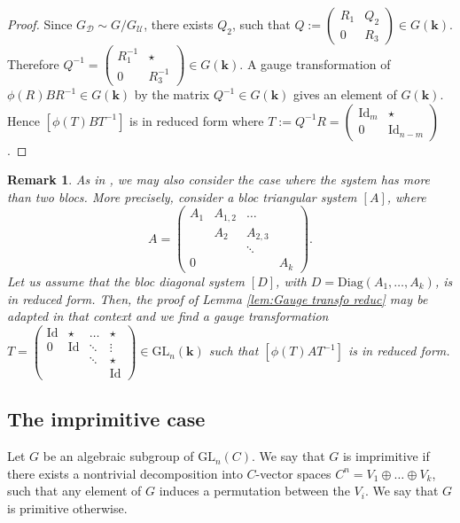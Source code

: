 \documentclass[a4paper,11pt]{amsart}
\newcommand{\GL}{\operatorname{GL}}
\newcommand{\Gdiag}{G_{\mathcal{D}}}
\newcommand{\Gunip}{G_{\mathcal{U}}}
\newtheorem{rem}[thm]{Remark}
\def\k{\mathbf{k}}
\def\GL{\mathrm{GL}}
\begin{document}
\begin{proof}
Since $\Gdiag\sim G/\Gunip$, there exists $Q_2$, such that $Q:= \begin{pmatrix}
R_1 & Q_2 \\ 0 & R_3
\end{pmatrix}\in G(\k)$. Therefore $Q^{-1} = \begin{pmatrix}
R_1^{-1} &\star \\ 0 & R_3^{-1}
\end{pmatrix}\in G(\k)$. A gauge transformation of $\phi(R)BR^{-1}\in G(\k)$ by the matrix  $Q^{-1}\in G(\k)$ gives an element of $G(\k)$. Hence $\left[\phi(T)BT^{-1}\right]$ is in reduced form where $T:= Q^{-1}R = \begin{pmatrix}
\mathrm{Id}_m & \star \\ 0 & \mathrm{Id}_{n-m}
\end{pmatrix}$.
\end{proof}

\begin{rem}\label{rem1}
As in \cite[Section 5]{dreyfus2019computing},  we may also consider the case where the system has more than two blocs.   More precisely, consider a bloc triangular system $[A]$, where  $$A=\left(\begin{array}{cccc}
A_1 &  A_{1,2}&\dots  &\\
 & A_2 &   A_{2,3}\\
&&\ddots& \\
0&&&A_k
\end{array}\right).$$
Let us assume that the bloc diagonal system $[D]$, with $D=\mathrm{Diag}(A_1,\dots, A_k)$, is in reduced form.   Then, the proof of Lemma \ref{lem:Gauge transfo reduc} may be adapted in that context and we find a gauge transformation $T=\left(\begin{array}{cccc}
\mathrm{Id} &  \star &\dots  & \star\\
0 & \mathrm{Id} & \ddots & \vdots \\
&&\ddots&  \star  \\
&&&\mathrm{Id}
\end{array}\right)\in \GL_n (\mathbf{k})$ such that $[\phi(T)A T^{-1}]$ is in reduced form.  
\end{rem}

\subsection{The imprimitive case}
\label{sec:imprimitive case}

 Let $G$ be an algebraic subgroup of $\GL_{n}(C)$.  We say that $G$ is imprimitive if there exists a nontrivial decomposition into $C$-vector spaces  $C^n =V_1 \oplus \dots \oplus V_k$, such that any element of $G$ induces a permutation between the $V_i$.  We say that $G$ is primitive otherwise.  
\end{document}
